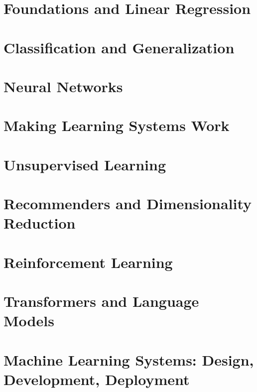\documentclass[11pt,b5paper,twoside,openright]{book}
\begin{document}



\tableofcontents

\mainmatter

\part{Foundations and Linear Regression}






\part{Classification and Generalization}



\part{Neural Networks}



\part{Making Learning Systems Work}




\part{Unsupervised Learning}



\part{Recommenders and Dimensionality Reduction}



\part{Reinforcement Learning}


\part{Transformers and Language Models}



\part{Machine Learning Systems: Design, Development, Deployment}



\end{document}
